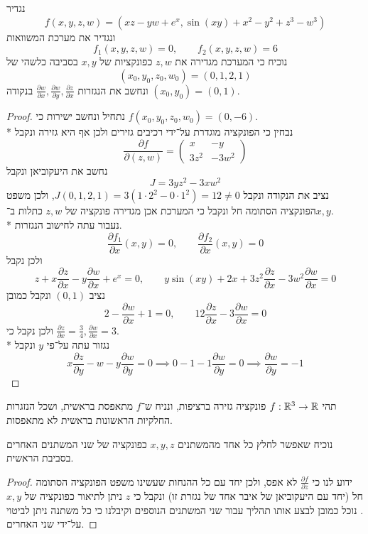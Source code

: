 \Question{}
נגדיר
\[
	f(x, y, z, w) = (xz - yw + e^x, \sin(xy) + x^2 - y^2 + z^3 - w^3)
\]
ונגדיר את מערכת המשוואות
\[
	f_1(x, y, z, w) = 0,
	\qquad
	f_2(x, y, z, w) = 6
\]
נוכיח כי המערכת מגדירה את $z, w$ כפונקציות של $x, y$ בסביבה כלשהי של
\[
	(x_0, y_0, z_0, w_0) = (0, 1, 2, 1)
\]
ונחשב את הנגזרות $\frac{\partial w}{\partial x}, \frac{\partial w}{\partial y}, \frac{\partial z}{\partial x}$ בנקודה $(x_0, y_0) = (0, 1)$.
\begin{proof}
	נתחיל ונחשב ישירות כי $f(x_0, y_0, z_0, w_0) = (0, -6)$. \\*
	נבחין כי הפונקציה מוגדרת על־ידי רכיבים גזירים ולכן אף היא גזירה ונקבל
	\[
		\frac{\partial f}{\partial (z, w)}
		= \begin{pmatrix}
			x & -y \\
			3z^2 & -3w^2
		\end{pmatrix}
	\]
	נחשב את היעקוביאן ונקבל
	\[
		J = 3yz^2 - 3xw^2
	\]
	נציב את הנקודה ונקבל $J(0, 1, 2, 1) = 3(1 \cdot 2^2 - 0 \cdot 1^2) = 12 \ne 0$, ולכן משפט הפונקציה הסתומה חל ונקבל כי המערכת אכן מגדירה פונקציה של $z, w$ כתלות ב־$x, y$. \\*
	נעבור עתה לחישוב הנגזרות.
	\[
		\frac{\partial f_1}{\partial x} (x, y) = 0,
		\qquad
		\frac{\partial f_2}{\partial x} (x, y) = 0
	\]
	ולכן נקבל
	\[
		z + x \frac{\partial z}{\partial x} - y \frac{\partial w}{\partial x} + e^x = 0,
		\qquad
		y \sin(xy) + 2x + 3z^2 \frac{\partial z}{\partial x} - 3w^2 \frac{\partial w}{\partial x} = 0
	\]
	נציב $(0, 1)$ ונקבל כמובן
	\[
		2 - \frac{\partial w}{\partial x} + 1 = 0,
		\qquad
		12 \frac{\partial z}{\partial x} - 3 \frac{\partial w}{\partial x} = 0
	\]
	ולכן נקבל כי $\frac{\partial z}{\partial x} = \frac{3}{4}, \frac{\partial w}{\partial x} = 3$. \\*
	נגזור עתה על־פי $y$ ונקבל
	\[
		x \frac{\partial z}{\partial y} - w - y \frac{\partial w}{\partial y} = 0
		\implies
		0 - 1  - 1\frac{\partial w}{\partial y} = 0
		\implies
		\frac{\partial w}{\partial y} = -1
	\]
\end{proof}

\Question{}
תהי $f : \mathbb{R}^3 \to \mathbb{R}$ פונקציה גזירה ברציפות, ונניח ש־$f$ מתאפסת בראשית, ושכל הנזגרות החלקיות הראשונות בראשית לא מתאפסות.

\Subquestion{}
נוכיח שאפשר לחלץ כל אחד מהמשתנים $x, y, z$ כפונקציה של שני המשתנים האחרים בסביבת הראשית.
\begin{proof}
	ידוע לנו כי $\frac{\partial f}{\partial z}$ לא אפס, ולכן יחד עם כל ההנחות שעשינו משפט הפונקציה הסתומה חל (יחד עם היעקוביאן של איבר אחד של נגזרת זו) ונקבל כי $z$ ניתן לתיאור כפונקציה של $x, y$.
	נוכל כמובן לבצע אותו תהליך עבור שני המשתנים הנוספים וקיבלנו כי כל משתנה ניתן לביטוי על־ידי שני האחרים.
\end{proof}


